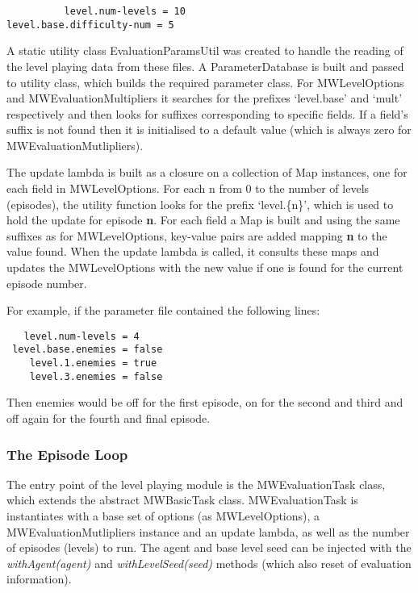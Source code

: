 \begin{minipage}{0.9\linewidth}
\centering
\begin{lstlisting}
          level.num-levels = 10
level.base.difficulty-num = 5
\end{lstlisting}
\end{minipage}

A static utility class EvaluationParamsUtil was created to handle the reading of the level playing data from these files. A ParameterDatabase is built and passed to utility class, which builds the required parameter class. For MWLevelOptions and MWEvaluationMultipliers it searches for the prefixes `{\ttfamily level.base}' and `{\ttfamily mult}' respectively and then looks for suffixes corresponding to specific fields. If a field's suffix is not found then it is initialised to a default value (which is always zero for MWEvaluationMutlipliers).

The update lambda is built as a closure on a collection of Map instances, one for each field in MWLevelOptions. For each {\ttfamily n} from 0 to the number of levels (episodes), the utility function looks for the prefix `{\ttfamily level.\{n\}}', which is used to hold the update for episode \textbf{n}. For each field a Map is built and using the same suffixes as for MWLevelOptions, key-value pairs are added mapping \textbf{n} to the value found. When the update lambda is called, it consults these maps and updates the MWLevelOptions with the new value if one is found for the current episode number.

For example, if the parameter file contained the following lines:

\begin{minipage}{0.9\linewidth}
\centering
\begin{lstlisting}
   level.num-levels = 4
 level.base.enemies = false
    level.1.enemies = true
    level.3.enemies = false
\end{lstlisting}
\end{minipage}

Then enemies would be off for the first episode, on for the second and third and off again for the fourth and final episode.

\subsubsection{The Episode Loop}

The entry point of the level playing module is the MWEvaluationTask class, which extends the abstract MWBasicTask class. MWEvaluationTask is instantiates with a base set of options (as MWLevelOptions), a MWEvaluationMutlipliers instance and an update lambda, as well as the number of episodes (levels) to run. The agent and base level seed can be injected with the \emph{withAgent(agent)} and \emph{withLevelSeed(seed)} methods (which also reset of evaluation information).

